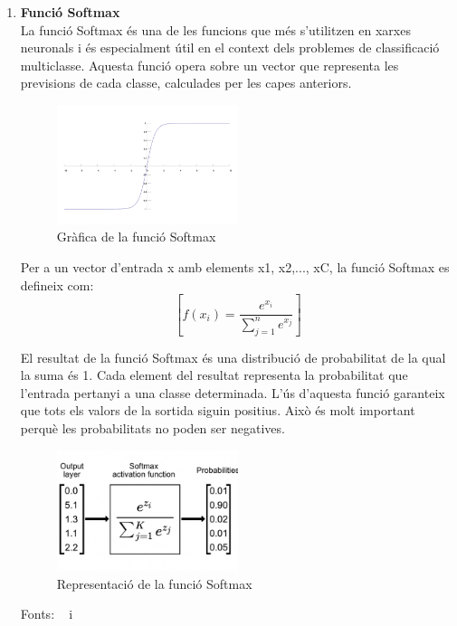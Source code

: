 \begin{enumerate}
\item \textbf{Funció Softmax}\\

La funció Softmax és una de les funcions que més s'utilitzen en xarxes neuronals i és especialment útil en el context dels problemes de classificació multiclasse. Aquesta funció opera sobre un vector que representa les previsions de cada classe, calculades per les capes anteriors.

\begin{figure}[h!]
    \centering
    \includegraphics[width=0.5\textwidth]{./figures/Softmax.png}
    \caption{Gràfica de la funció Softmax}
\end{figure}

Per a un vector d'entrada x amb elements x1, x2,..., xC, la funció Softmax es defineix com:
$$[f(x_i) = \frac{e^{x_i}}{\sum_{j=1}^{n} e^{x_j}}]$$

El resultat de la funció Softmax és una distribució de probabilitat de la qual la suma és 1. Cada element del resultat representa la probabilitat que l'entrada pertanyi a una classe determinada. L'ús d'aquesta funció garanteix que tots els valors de la sortida siguin positius. Això és molt important perquè les probabilitats no poden ser negatives.

\begin{figure}[H]
    \centering
    \includegraphics[width=0.5\textwidth]{./figures/representacio_Softmax.png}
    \caption{Representació de la funció Softmax}
\end{figure}

Fonts: ~\cite{Hidden_layer} i~\cite{Jacar}
\end{enumerate}

